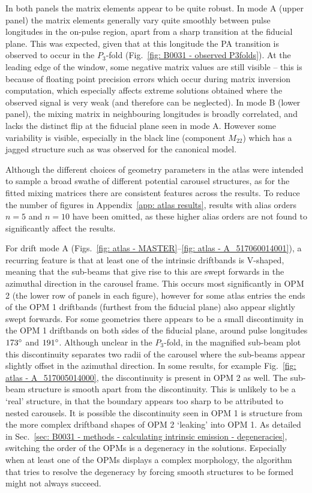 In both panels the matrix elements appear to be quite robust. In mode A (upper panel) the matrix elements generally vary quite smoothly between pulse longitudes in the on-pulse region, apart from a sharp transition at the fiducial plane. This was expected, given that at this longitude the PA transition is observed to occur in the $P_3$-fold (Fig.~\ref{fig: B0031 - observed P3folds}). At the leading edge of the window, some negative matrix values are still visible -- this is because of floating point precision errors which occur during matrix inversion computation, which especially affects extreme solutions obtained where the observed signal is very weak (and therefore can be neglected). In mode B (lower panel), the mixing matrix in neighbouring longitudes is broadly correlated, and lacks the distinct flip at the fiducial plane seen in mode A. However some variability is visible, especially in the black line (component $M_{22}$) which has a jagged structure such as was observed for the canonical model.

Although the different choices of geometry parameters in the atlas were intended to sample a broad swathe of different potential carousel structures, as for the fitted mixing matrices there are consistent features across the results. To reduce the number of figures in Appendix~\ref{app: atlas results}, results with alias orders $n=5$ and $n=10$ have been omitted, as these higher alias orders are not found to significantly affect the results.

For drift mode A (Figs.~\ref{fig: atlas - MASTER}--\ref{fig: atlas - A_517060014001}), a recurring feature is that at least one of the intrinsic driftbands is V-shaped, meaning that the sub-beams that give rise to this are swept forwards in the azimuthal direction in the carousel frame. This occurs most significantly in OPM 2 (the lower row of panels in each figure), however for some atlas entries the ends of the OPM 1 driftbands (furthest from the fiducial plane) also appear slightly swept forwards. For some geometries there appears to be a small discontinuity in the OPM 1 driftbands on both sides of the fiducial plane, around pulse longitudes $173^\circ$ and $191^\circ$. Although unclear in the $P_3$-fold, in the magnified sub-beam plot this discontinuity separates two radii of the carousel where the sub-beams appear slightly offset in the azimuthal direction. In some results, for example Fig.~\ref{fig: atlas - A_517005014000}, the discontinuity is present in OPM 2 as well. The sub-beam structure is smooth apart from the discontinuity. This is unlikely to be a `real' structure, in that the boundary appears too sharp to be attributed to nested carousels. It is possible the discontinuity seen in OPM 1 is structure from the more complex driftband shapes of OPM 2 `leaking' into OPM 1. As detailed in Sec.~\ref{sec: B0031 - methods - calculating intrinsic emission - degeneracies}, switching the order of the OPMs is a degeneracy in the solutions. Especially when at least one of the OPMs displays a complex morphology, the algorithm that tries to resolve the degeneracy by forcing smooth structures to be formed might not always succeed.

